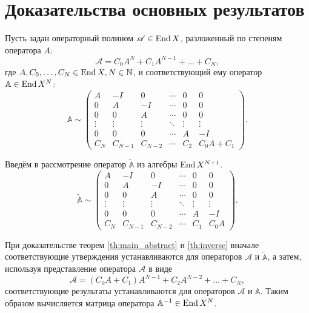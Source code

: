 \section{Доказательства основных результатов}
Пусть задан операторный полином $ \mathcal A \in \operatorname{End} X$, разложенный по степеням оператора $A$:
\[  \mathcal A = C_0 A^N + C_1 A^{N - 1} + \dotsc + C_N, \]
где $A, C_0, \dotsc, C_N \in \operatorname{End} X, N \in \mathbb{N}$, и соответствующий ему оператор $\mathbb A \hm\in \End{X^N}$:
\[ \mathbb A \sim \begin{pmatrix}
    A & -I & 0  & \cdots & 0 & 0 \\
    0 & A  & -I & \cdots & 0 & 0 \\
    0 & 0  & A & \cdots & 0 & 0 \\
    \vdots & \vdots & \vdots & \ddots & \vdots & \vdots \\
    0 & 0 & 0 & \cdots & A & -I \\
    C_N & C_{N-1} & C_{N-2} & \cdots & C_2 & C_0 A + C_1
   \end{pmatrix}. \]

Введём в рассмотрение оператор $\widetilde{\mathbb A}$ из алгебры $\operatorname{End}{X^{N+1}}$.
\[ \widetilde{\mathbb A} \sim \begin{pmatrix}
    A & -I & 0  & \cdots & 0 & 0 \\
    0 & A  & -I & \cdots & 0 & 0 \\
    0 & 0  & A & \cdots & 0 & 0 \\
    \vdots & \vdots & \vdots & \ddots & \vdots & \vdots \\
    0 & 0 & 0 & \cdots & A & -I \\
    C_N & C_{N-1} & C_{N-2} & \cdots & C_1 & C_0 A
   \end{pmatrix}. \]

При доказательстве теорем \ref{th:main_abstract} и \ref{th:inverse} вначале соответствующие утверждения устанавливаются для операторов $\mathcal A$ и $\widetilde{\mathbb A}$, а затем, используя представление оператора $\mathcal A$ в виде
\[\mathcal A = (C_0 A + C_1) A^{N-1} + C_2 A^{N-2} + \dotsc + C_N, \]
соответствующие результаты устанавливаются для операторов $\mathcal A$ и $\mathbb A$. Таким образом вычисляется матрица оператора $\mathbb A^{-1} \in \operatorname{End}{X^N}$.

